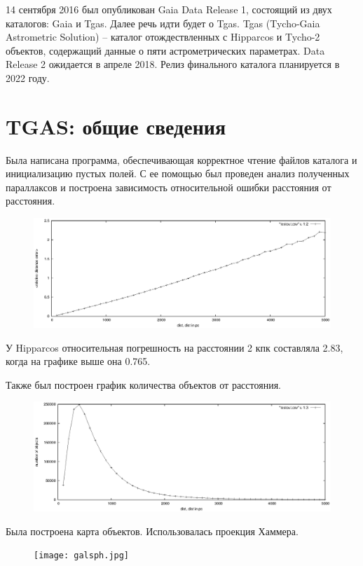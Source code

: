 \documentclass[14pt]{article} %
\begin{document}
14 сентября 2016 был опубликован Gaia Data Release 1, состоящий из двух каталогов: Gaia и Tgas. Далее речь идти будет о Tgas. Tgas (Tycho-Gaia Astrometric Solution) -- каталог отождествленных с Hipparcos и Tycho-2 объектов, содержащий данные о пяти астрометрических параметрах. Data Release 2 ожидается в апреле 2018. Релиз финального каталога планируется в 2022 году.
\newpage\section{TGAS: общие сведения}
Была написана программа, обеспечивающая корректное чтение файлов каталога и инициализацию пустых полей. С ее помощью был проведен анализ полученных параллаксов и построена зависимость относительной ошибки расстояния от расстояния.
\begin{figure}[h!]
\includegraphics[width=1\linewidth]{distvserr.eps}
\end{figure}

У Hipparcos относительная погрешность на расстоянии 2 кпк составляла 2.83, когда на графике выше она 0.765.

Также был построен график количества объектов от расстояния.
\begin{figure}[h!]
\includegraphics[width=1\linewidth]{distvsN.eps}
\end{figure}\newpage

Была построена карта объектов. Использовалась проекция Хаммера.
\begin{figure}[h!]
\texttt{[image: galsph.jpg]}
\end{figure}
\end{document}
